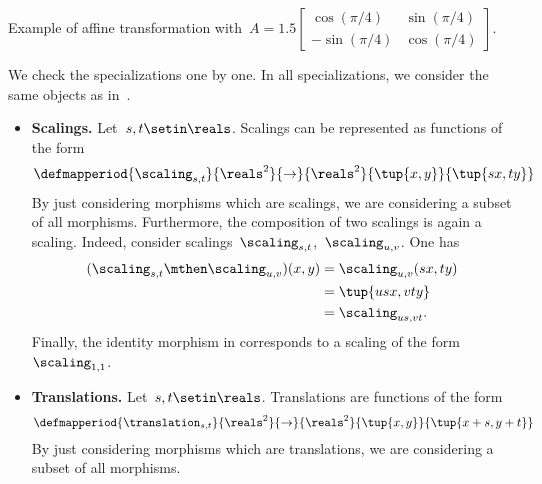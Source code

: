 \begin{solution}
    \begin{marginfigure}
        \begin{center}
        \end{center}
        \caption{Example of affine transformation with~$A=1.5\begin{bmatrix}
                    \cos(\pi/4) & \sin(\pi/4) \\-\sin(\pi/4)& \cos(\pi/4)
                \end{bmatrix}$.}
    \end{marginfigure}
    We check the specializations one by one.
    In all specializations, we consider the same objects as in~\Draw.
    \begin{itemize}
        \item \textbf{Scalings.}
              Let~$s,t\setin \reals$.
              Scalings can be represented as functions of the form
              \begin{equation}
                  \defmapperiod{\scaling_{s,t}}{\reals^2}{\to}{\reals^2}{\tup{x,y}}{\tup{s x,t y}}
              \end{equation}
              By just considering morphisms which are scalings, we are considering a subset of all morphisms.
              Furthermore, the composition of two scalings is again a scaling.
              Indeed, consider scalings~$\scaling_{s,t}$,~$\scaling_{u,v}$.
              One has
              \begin{equation}
                  \begin{aligned}
                      (\scaling_{s,t}\mthen \scaling_{u,v})(x,y)
                       & =\scaling_{u,v}(sx, ty) \\
                       & =\tup{usx, vty} \\
                       & =\scaling_{us,vt}.
                  \end{aligned}
              \end{equation}
              Finally, the identity morphism in \Draw corresponds to a scaling of the form $\scaling_{1,1}$.
        \item \textbf{Translations.}
              Let~$s,t\setin \reals$.
              Translations are functions of the form
              \begin{equation}
                  \defmapperiod{\translation_{s,t}}{\reals^2}{\to}{\reals^2}{\tup{x,y}}{\tup{x+s,y+t}}
              \end{equation}
              By just considering morphisms which are translations, we are considering a subset of all morphisms.

\end{itemize}
\end{solution}

